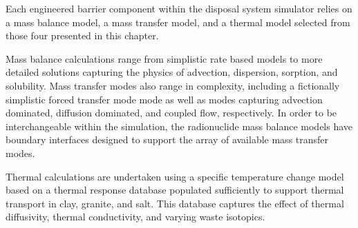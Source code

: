 Each engineered barrier component within the \Cyder disposal system simulator 
relies on a mass balance model, a mass transfer model, and a thermal model 
selected from those four presented in this chapter. 

Mass balance calculations range from simplistic rate based models to more 
detailed solutions capturing the physics of advection, dispersion, sorption, 
and solubility.  Mass transfer modes also range in complexity, including a 
fictionally simplistic forced transfer mode mode as well as modes capturing 
advection dominated, diffusion dominated, and coupled flow, respectively.  In 
order to be interchangeable within the simulation, the radionuclide mass 
balance models have boundary interfaces designed to support the array of 
available mass transfer modes. 

Thermal calculations are undertaken using a specific temperature change model 
based on a thermal response database populated sufficiently to support thermal 
transport in clay, granite, and salt. This database captures the effect of 
thermal diffusivity, thermal conductivity, and varying waste isotopics.
